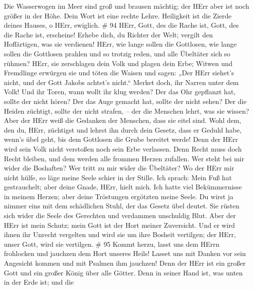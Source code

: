  Die Wasserwogen im Meer sind groß und brausen mächtig; der
HErr aber ist noch größer in der Höhe.  Dein Wort ist eine
rechte Lehre. Heiligkeit ist die Zierde deines Hauses, o HErr, ewiglich.
\# 94  HErr, Gott, des die Rache ist, Gott, des die Rache
ist, erscheine!  Erhebe dich, du Richter der Welt; vergilt
den Hoffärtigen, was sie verdienen!  HErr, wie lange sollen
die Gottlosen, wie lange sollen die Gottlosen prahlen  und
so trotzig reden, und alle Übeltäter sich so rühmen?  HErr,
sie zerschlagen dein Volk und plagen dein Erbe;  Witwen und
Fremdlinge erwürgen sie und töten die Waisen  und sagen:
„Der HErr siehet's nicht, und der Gott Jakobs achtet's nicht.``
 Merket doch, ihr Narren unter dem Volk! Und ihr Toren, wann
wollt ihr klug werden?  Der das Ohr gepflanzt hat, sollte
der nicht hören? Der das Auge gemacht hat, sollte der nicht sehen?
 Der die Heiden züchtigt, sollte der nicht strafen, -- der
die Menschen lehrt, was sie wissen?  Aber der HErr weiß die
Gedanken der Menschen, dass sie eitel sind.  Wohl dem, den
du, HErr, züchtigst und lehrst ihn durch dein Gesetz,  dass
er Geduld habe, wenn's übel geht, bis dem Gottlosen die Grube bereitet
werde!  Denn der HErr wird sein Volk nicht verstoßen noch
sein Erbe verlassen.  Denn Recht muss doch Recht bleiben,
und dem werden alle frommen Herzen zufallen.  Wer steht bei
mir wider die Boshaften? Wer tritt zu mir wider die Übeltäter?
 Wo der HErr mir nicht hülfe, so läge meine Seele schier in
der Stille.  Ich sprach: Mein Fuß hat gestrauchelt; aber
deine Gnade, HErr, hielt mich.  Ich hatte viel
Bekümmernisse in meinem Herzen; aber deine Tröstungen ergötzten meine
Seele.  Du wirst ja nimmer eins mit dem schädlichen Stuhl,
der das Gesetz übel deutet.  Sie rüsten sich wider die
Seele des Gerechten und verdammen unschuldig Blut.  Aber
der HErr ist mein Schutz; mein Gott ist der Hort meiner Zuversicht.
 Und er wird ihnen ihr Unrecht vergelten und wird sie um
ihre Bosheit vertilgen; der HErr, unser Gott, wird sie vertilgen. \# 95
 Kommt herzu, lasst uns dem HErrn frohlocken und jauchzen
dem Hort unseres Heils!  Lasset uns mit Danken vor sein
Angesicht kommen und mit Psalmen ihm jauchzen!  Denn der
HErr ist ein großer Gott und ein großer König über alle Götter.
 Denn in seiner Hand ist, was unten in der Erde ist; und die
